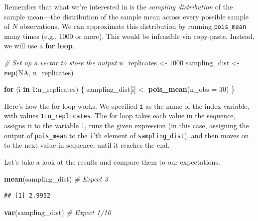\documentclass[12pt,oneside,openany]{book}
\newenvironment{Shaded}{\begin{snugshade}}{\end{snugshade}}
\newcommand{\KeywordTok}[1]{\textcolor[rgb]{0.13,0.29,0.53}{\textbf{#1}}}
\newcommand{\DataTypeTok}[1]{\textcolor[rgb]{0.13,0.29,0.53}{#1}}
\newcommand{\DecValTok}[1]{\textcolor[rgb]{0.00,0.00,0.81}{#1}}
\newcommand{\StringTok}[1]{\textcolor[rgb]{0.31,0.60,0.02}{#1}}
\newcommand{\CommentTok}[1]{\textcolor[rgb]{0.56,0.35,0.01}{\textit{#1}}}
\newcommand{\OtherTok}[1]{\textcolor[rgb]{0.56,0.35,0.01}{#1}}
\newcommand{\ControlFlowTok}[1]{\textcolor[rgb]{0.13,0.29,0.53}{\textbf{#1}}}
\newcommand{\OperatorTok}[1]{\textcolor[rgb]{0.81,0.36,0.00}{\textbf{#1}}}
\newcommand{\NormalTok}[1]{#1}
\begin{document}
Remember that what we're interested in is the \emph{sampling
distribution} of the sample mean---the distribution of the sample mean
across every possible sample of \(N\) observations. We can approximate
this distribution by running \texttt{pois\_mean} many times (e.g., 1000
or more). This would be infeasible via copy-paste. Instead, we will use
a \textbf{for loop}.

\begin{Shaded}
\begin{Highlighting}[]
\CommentTok{# Set up a vector to store the output}
\NormalTok{n_replicates <-}\StringTok{ }\DecValTok{1000}
\NormalTok{sampling_dist <-}\StringTok{ }\KeywordTok{rep}\NormalTok{(}\OtherTok{NA}\NormalTok{, n_replicates)}

\ControlFlowTok{for}\NormalTok{ (i }\ControlFlowTok{in} \DecValTok{1}\OperatorTok{:}\NormalTok{n_replicates) \{}
\NormalTok{  sampling_dist[i] <-}\StringTok{ }\KeywordTok{pois_mean}\NormalTok{(}\DataTypeTok{n_obs =} \DecValTok{30}\NormalTok{)}
\NormalTok{\}}
\end{Highlighting}
\end{Shaded}

Here's how the for loop works. We specified \texttt{i} as the name of
the index variable, with values \texttt{1:n\_replicates}. The for loop
takes each value in the sequence, assigns it to the variable \texttt{i},
runs the given expression (in this case, assigning the output of
\texttt{pois\_mean} to the \texttt{i}'th element of
\texttt{sampling\_dist}), and then moves on to the next value in
sequence, until it reaches the end.

Let's take a look at the results and compare them to our expectations.

\begin{Shaded}
\begin{Highlighting}[]
\KeywordTok{mean}\NormalTok{(sampling_dist)  }\CommentTok{# Expect 3}
\end{Highlighting}
\end{Shaded}

\begin{verbatim}
## [1] 2.9952
\end{verbatim}

\begin{Shaded}
\begin{Highlighting}[]
\KeywordTok{var}\NormalTok{(sampling_dist)  }\CommentTok{# Expect 1/10}
\end{Highlighting}
\end{Shaded}
\end{document}
